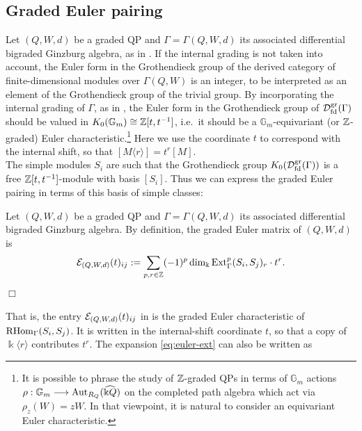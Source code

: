 \subsection{Graded Euler pairing}\label{ssec:graded_Euler_pairing} Let $(Q,W,d)$ be a graded QP and $\Gamma=\Gamma(Q,W,d)$ its associated differential bigraded Ginzburg algebra, as in . If the internal grading is not taken into account, the Euler form in the Grothendieck group of the derived category of finite-dimensional modules over $\Gamma(Q,W)$ is an integer, to be interpreted as an element of the Grothendieck group of the trivial group. By incorporating the internal grading of $\Gamma$, as in , the Euler form in the Grothendieck group of $\mathcal D^{\mathrm{gr}}_{\mathrm{fd}}(\Gamma)$ should be valued in $K_0(\mathbb{G}_m)\cong\mathbb Z[t,t^{-1}]$, i.e.~it should be a $\mathbb{G}_m$-equivariant (or $\mathbb Z$-graded) Euler characteristic.\footnote{It is possible to phrase the study of $\mathbb Z$-graded QPs in terms of $\mathbb{G}_m$ actions $\rho:\mathbb{G}_m\longrightarrow\mbox{Aut}_{R_Q}(\widehat{\Bbbk Q})$ on the completed path algebra which act via $\rho_z(W)=zW$. In that viewpoint, it is natural to consider an equivariant Euler characteristic.} Here we use the coordinate $t$ to correspond with the internal shift, so that $[M\langle r\rangle]=t^r[M]$.\\

The simple modules $S_i$ are such that the Grothendieck group $K_0(\mathcal D^{\mathrm{gr}}_{\mathrm{fd}}(\Gamma))$ is a free $\mathbb Z[t,t^{-1}]$-module with basis $[S_i]$. Thus we can express the graded Euler pairing in terms of this basis of simple classes:

\begin{definition}\label{def:euler}
Let $(Q,W,d)$ be a graded QP and $\Gamma=\Gamma(Q,W,d)$ its associated differential bigraded Ginzburg algebra. By definition, the graded Euler matrix of
\((Q,W,d)\) is
\begin{equation}\label{eq:euler-ext}
 \mathcal E_{(Q,W,d)}(t)_{ij}
 :=\sum_{p,r\in\mathbb Z}(-1)^p
 \dim_\Bbbk\operatorname{Ext}^{p}_{\Gamma}(S_i,S_j)_r\cdot t^{r}.
\end{equation}
\hfill$\Box$\end{definition}
\noindent That is, the entry $\mathcal E_{(Q,W,d)}(t)_{ij}$ in  is the graded Euler characteristic of $\operatorname{RHom}_{\Gamma}(S_i,S_j)$. It is written in
the internal-shift coordinate $t$, so that a copy of
$\Bbbk\langle r\rangle$ contributes $t^r$. The expansion \eqref{eq:euler-ext} can also be written as

